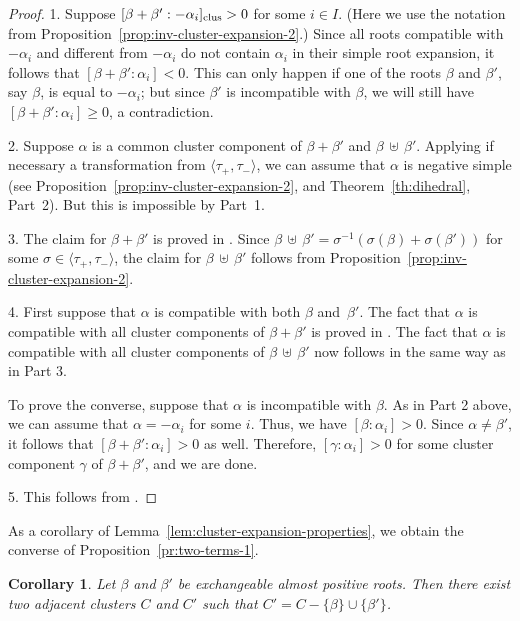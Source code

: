 \documentclass[letterpaper]{amsart}
\numberwithin{equation}{section}
\newtheorem{corollary}[theorem]{Corollary}
\theoremstyle{definition}
\def\subplus{{\,\uplus\,} }
\begin{document}
 
\begin{proof} 
 
 1. Suppose $[\beta+ \beta': - \alpha_i]_{\rm clus} > 0$ 
for some $i \in I$. 
(Here we use the notation from 
Proposition~\ref{prop:inv-cluster-expansion-2}.) 
Since all roots compatible with $- \alpha_i$ and different 
from $- \alpha_i$ do not contain $\alpha_i$ in their simple root 
expansion, it follows that $[\beta+ \beta': \alpha_i] < 0$. 
This can only happen if one of the roots $\beta$ and $\beta'$, say 
$\beta$, is equal to $- \alpha_i$; but since $\beta'$ is 
incompatible with $\beta$, we will still have $[\beta+ \beta': \alpha_i] \geq 0$, 
a contradiction. 
 
 2. Suppose $\alpha$ is a  common cluster component of 
$\beta + \beta'$ and $\beta \subplus \beta'$. 
Applying if necessary a transformation from $\langle \tau_+, 
\tau_- \rangle$, we can assume that $\alpha$ is negative simple 
(see Proposition~\ref{prop:inv-cluster-expansion-2}, 
and Theorem~\ref{th:dihedral}, Part~2). 
But this is impossible by Part~1. 
 
 3. The claim for $\beta + \beta'$ is proved in \cite[Lemma~2.3]{cfz}. 
Since $\beta \subplus \beta' = \sigma^{-1} (\sigma (\beta) + 
\sigma (\beta'))$ for some $\sigma \in \langle \tau_+, \tau_- \rangle$, 
the claim for  $\beta \subplus \beta'$ follows from 
Proposition~\ref{prop:inv-cluster-expansion-2}. 
 
 4. First suppose that $\alpha$ is compatible with both $\beta$ 
and~$\beta'$. 
The fact that $\alpha$ is compatible with all cluster components of 
$\beta + \beta'$ is proved in \cite[Lemma~2.3]{cfz}. 
The fact that $\alpha$ is compatible with all cluster components of 
$\beta \subplus \beta'$ now follows in the same way as in Part 3. 
 
To prove the converse, suppose that $\alpha$ is incompatible with $\beta$. 
As in Part 2 above, we can assume that $\alpha = - \alpha_i$ for some $i$. 
Thus, we have $[\beta : \alpha_i] > 0$. 
Since $\alpha \neq \beta'$, it follows that 
$[\beta + \beta': \alpha_i] > 0$ as well. 
Therefore, $[\gamma : \alpha_i] > 0$ for some cluster component 
$\gamma$ of $\beta + \beta'$, and we are done. 
 
5. This follows from \cite[Theorem~1.17]{cfz}. 
\end{proof} 
 
As a corollary of Lemma~\ref{lem:cluster-expansion-properties}, 
we obtain the converse of Proposition~\ref{pr:two-terms-1}. 
 
\begin{corollary} 
\label{cor:exch-roots-converse} 
Let $\beta$ and $\beta'$ be exchangeable almost positive roots. 
Then there exist two adjacent clusters $C$ and $C'$ 
such that $C'=C-\{\beta\}\cup\{\beta'\}$. 
\end{corollary} 
 
\end{document}
